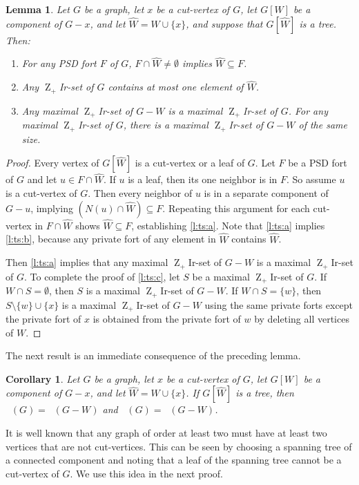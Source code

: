 \documentclass{article}
\numberwithin{figure}{section}
\numberwithin{table}{section}
\numberwithin{equation}{section}
\newtheorem{cor}[thm]{Corollary}
\newtheorem{lem}[thm]{Lemma}
\theoremstyle{definition}
\theoremstyle{definition}
\theoremstyle{definition}
\newcommand{\ben}{\begin{enumerate}}
\newcommand{\een}{\end{enumerate}}
\newcommand{\bpf}{\begin{proof}}
\newcommand{\epf}{\end{proof}\ms}
\newcommand{\ms}{\medskip}
\newcommand{\wh}{\widehat}
\newcommand{\Zp}{\operatorname{Z}_+}
\DeclareMathOperator{\zpir}{z_+ir}
\DeclareMathOperator{\ZpIR}{Z_+IR}
\begin{document}
\begin{lem}\label{l:treestrip} Let $G$ be a graph, let $x$ be a cut-vertex of $G$,  let   $G[W]$ be a component of $G-x$, and let $\wh W =W\cup\{x\}$, and suppose that $G[\wh W]$ is  a tree. Then:
\ben[$(a)$]
\item\label{l:ts:a} For any PSD fort $F$ of $G$, $F\cap\wh W\ne \emptyset$ implies $\wh W\subseteq F$.
\item\label{l:ts:b} Any $\Zp$Ir-set of $G$ contains at most one element of $\wh W$.
\item\label{l:ts:c} Any maximal $\Zp$Ir-set of $G-W$ is a maximal $\Zp$Ir-set of $G$. For any maximal $\Zp$Ir-set of $G$, there is a maximal $\Zp$Ir-set of $G-W$ of the same size.
\een
\end{lem}



\bpf  
Every vertex of $G[\wh W]$ is a cut-vertex or a leaf of $G$.  
Let $F$ be a PSD fort of $G$ and let $u\in F\cap \wh W$.  If $u$ is a leaf, then its one neighbor is in $F$. So assume $u$ is  a cut-vertex of $G$.  Then every neighbor of $u$ is in a separate component of $G-u$, implying $(N(u)\cap \wh W)\subseteq F$.  Repeating this  argument for each cut-vertex in $F\cap \wh W$ shows $\wh W\subseteq F$, establishing \eqref{l:ts:a}.   
Note that \eqref{l:ts:a} implies \eqref{l:ts:b}, because any private fort of any element in $\wh W$ contains $\wh W$.  

Then \eqref{l:ts:a} implies that any maximal $\Zp$Ir-set of $G-W$ is a maximal $\Zp$Ir-set of $G$.  To complete the proof of \eqref{l:ts:c}, let $S$ be a maximal $\Zp$Ir-set of $G$.  If $W\cap S=\emptyset$, then $S$ is a maximal $\Zp$Ir-set of $G-W$.  If $W\cap S=\{w\}$, then $S\setminus\{w\}\cup\{x\}$ is a maximal $\Zp$Ir-set of $G-W$ using the same private forts except the private fort of $x$ is obtained from the private fort of $w$ by deleting all vertices of $W$. 
\epf

The next result is an immediate consequence of the preceding lemma.

\begin{cor}\label{c:treestrip} Let $G$ be a graph, let $x$ be a cut-vertex of $G$,  let   $G[W]$ be a component of $G-x$, and let $\wh W =W\cup\{x\}$.  If $G[\wh W]$ is  a tree, then $\zpir(G)=\zpir(G-W)$ and  $\ZpIR(G)=\ZpIR(G-W)$.
\end{cor}

It is well known that any graph of order at least two must have  at least two vertices that are not cut-vertices.  This can be seen by choosing a spanning tree of a connected component and noting that a leaf of the spanning tree cannot be a cut-vertex of $G$.  We use this idea in the next proof.
\end{document}
